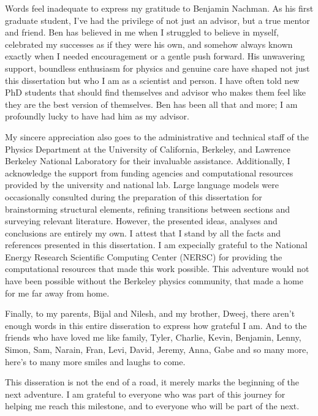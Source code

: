 \begin{acknowledgements}
    Words feel inadequate to express my gratitude to Benjamin Nachman.
    As his first graduate student, I've had the privilege of not just an advisor, but a true mentor and friend.
    Ben has believed in me when I struggled to believe in myself, celebrated my successes as if they were his own, and somehow always known exactly when I needed encouragement or a gentle push forward.
    His unwavering support, boundless enthusiasm for physics and genuine care have shaped not just this dissertation but who I am as a scientist and person.
    I have often told new PhD students that should find themselves and advisor who makes them feel like they are the best version of themselves.
    Ben has been all that and more;
    I am profoundly lucky to have had him as my advisor.
    
    My sincere appreciation also goes to the administrative and technical staff of the Physics Department at the University of California, Berkeley, and Lawrence Berkeley National Laboratory for their invaluable assistance.
    Additionally, I acknowledge the support from funding agencies and computational resources provided by the university and national lab.
    Large language models were occasionally consulted during the preparation of this dissertation for brainstorming structural elements, refining transitions between sections and surveying relevant literature.
    However, the presented ideas, analyses and conclusions are entirely my own.
    I attest that I stand by all the facts and references presented in this dissertation.
    I am expecially grateful to the National Energy Research Scientific Computing Center (NERSC) for providing the computational resources that made this work possible.
    This adventure would not have been possible without the Berkeley physics community, that made a home for me far away from home.
    
    Finally, to my parents, Bijal and Nilesh, and my brother, Dweej, there aren't enough words in this entire disseration to express how grateful I am.
    And to the friends who have loved me like family, Tyler, Charlie, Kevin, Benjamin, Lenny, Simon, Sam, Narain, Fran, Levi, David, Jeremy, Anna, Gabe and so many more, here's to many more smiles and laughs to come.

    This disseration is not the end of a road, it merely marks the beginning of the next adventure.
    I am grateful to everyone who was part of this journey for helping me reach this milestone, and to everyone who will be part of the next.
    
\end{acknowledgements}